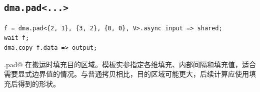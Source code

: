 \subsection*{\texttt{dma.pad\textless{}...\textgreater{}}}

\begin{lstlisting}[language=croqtile,caption={dma.pad\textless{}...\textgreater{}}]
f = dma.pad<{2, 1}, {3, 2}, {0, 0}, V>.async input => shared;
wait f;
dma.copy f.data => output;
\end{lstlisting}

\co@dma.pad@ 在搬运时填充目的区域。模板实参指定各维填充、内部间隔和填充值，适合需要显式边界值的情况。与普通拷贝相比，目的区域可能更大，后续计算应使用填充后得到的形状。
